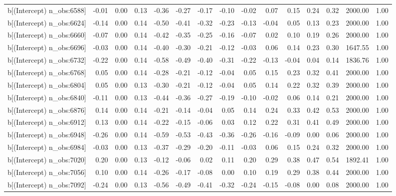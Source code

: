 \begin{table}[ht]
\begin{tabular}{rrrrrrrrrrrrrrr}
  b[(Intercept) n\_obs:6588] & -0.01 & 0.00 & 0.13 & -0.36 & -0.27 & -0.17 & -0.10 & -0.02 & 0.07 & 0.15 & 0.24 & 0.32 & 2000.00 & 1.00 \\ 
  b[(Intercept) n\_obs:6624] & -0.14 & 0.00 & 0.14 & -0.50 & -0.41 & -0.32 & -0.23 & -0.13 & -0.04 & 0.05 & 0.13 & 0.23 & 2000.00 & 1.00 \\ 
  b[(Intercept) n\_obs:6660] & -0.07 & 0.00 & 0.14 & -0.42 & -0.35 & -0.25 & -0.16 & -0.07 & 0.02 & 0.10 & 0.19 & 0.26 & 2000.00 & 1.00 \\ 
  b[(Intercept) n\_obs:6696] & -0.03 & 0.00 & 0.14 & -0.40 & -0.30 & -0.21 & -0.12 & -0.03 & 0.06 & 0.14 & 0.23 & 0.30 & 1647.55 & 1.00 \\ 
  b[(Intercept) n\_obs:6732] & -0.22 & 0.00 & 0.14 & -0.58 & -0.49 & -0.40 & -0.31 & -0.22 & -0.13 & -0.04 & 0.04 & 0.14 & 1836.76 & 1.00 \\ 
  b[(Intercept) n\_obs:6768] & 0.05 & 0.00 & 0.14 & -0.28 & -0.21 & -0.12 & -0.04 & 0.05 & 0.15 & 0.23 & 0.32 & 0.41 & 2000.00 & 1.00 \\ 
  b[(Intercept) n\_obs:6804] & 0.05 & 0.00 & 0.13 & -0.30 & -0.21 & -0.12 & -0.04 & 0.05 & 0.14 & 0.22 & 0.32 & 0.39 & 2000.00 & 1.00 \\ 
  b[(Intercept) n\_obs:6840] & -0.11 & 0.00 & 0.13 & -0.44 & -0.36 & -0.27 & -0.19 & -0.10 & -0.02 & 0.06 & 0.14 & 0.21 & 2000.00 & 1.00 \\ 
  b[(Intercept) n\_obs:6876] & 0.14 & 0.00 & 0.14 & -0.21 & -0.14 & -0.04 & 0.05 & 0.14 & 0.24 & 0.33 & 0.42 & 0.53 & 2000.00 & 1.00 \\ 
  b[(Intercept) n\_obs:6912] & 0.13 & 0.00 & 0.14 & -0.22 & -0.15 & -0.06 & 0.03 & 0.12 & 0.22 & 0.31 & 0.41 & 0.49 & 2000.00 & 1.00 \\ 
  b[(Intercept) n\_obs:6948] & -0.26 & 0.00 & 0.14 & -0.59 & -0.53 & -0.43 & -0.36 & -0.26 & -0.16 & -0.09 & 0.00 & 0.06 & 2000.00 & 1.00 \\ 
  b[(Intercept) n\_obs:6984] & -0.03 & 0.00 & 0.13 & -0.37 & -0.29 & -0.20 & -0.11 & -0.03 & 0.06 & 0.15 & 0.24 & 0.32 & 2000.00 & 1.00 \\ 
  b[(Intercept) n\_obs:7020] & 0.20 & 0.00 & 0.13 & -0.12 & -0.06 & 0.02 & 0.11 & 0.20 & 0.29 & 0.38 & 0.47 & 0.54 & 1892.41 & 1.00 \\ 
  b[(Intercept) n\_obs:7056] & 0.10 & 0.00 & 0.14 & -0.26 & -0.17 & -0.08 & 0.00 & 0.10 & 0.19 & 0.29 & 0.38 & 0.44 & 2000.00 & 1.00 \\ 
  b[(Intercept) n\_obs:7092] & -0.24 & 0.00 & 0.13 & -0.56 & -0.49 & -0.41 & -0.32 & -0.24 & -0.15 & -0.08 & 0.00 & 0.08 & 2000.00 & 1.00 \\ 

\end{tabular}
\end{table}
